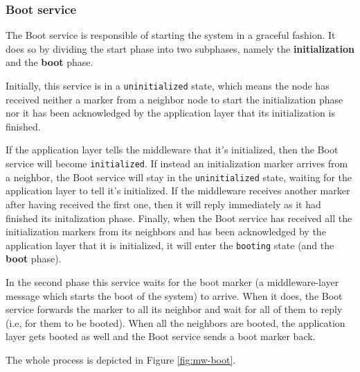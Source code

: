 \subsubsection{Boot service}\label{sec:mw-boot-descr}

The Boot service is responsible of starting the system in a graceful fashion.
It does so by dividing the start phase into two subphases, namely the
\textbf{initialization} and the \textbf{boot} phase.

Initially, this service is in a \texttt{uninitialized} state, which means the
node has received neither a marker from a neighbor node to start the
initialization phase nor it has been acknowledged by the application layer that
its initialization is finished.

If the application layer tells the middleware that it's initialized, then the
Boot service will become \texttt{initialized}. If instead an initialization
marker arrives from a neighbor, the Boot service will stay in the
\texttt{uninitialized} state, waiting for the application layer to tell it's
initialized.
If the middleware receives another marker after having received the first one,
then it will reply immediately as it had finished its initalization phase.
Finally, when the Boot service has received all the initialization markers from
its neighbors and has been acknowledged by the application layer that it is
initialized, it will enter the \texttt{booting} state (and the \textbf{boot}
phase).

In the second phase this service waits for the boot marker (a middleware-layer
message which starts the boot of the system) to arrive. When it does, the Boot
service forwards the marker to all its neighbor and wait for all of them to
reply (i.e, for them to be booted).
When all the neighbors are booted, the application layer gets booted as
well and the Boot service sends a boot marker back.

The whole process is depicted in Figure \ref{fig:mw-boot}.

